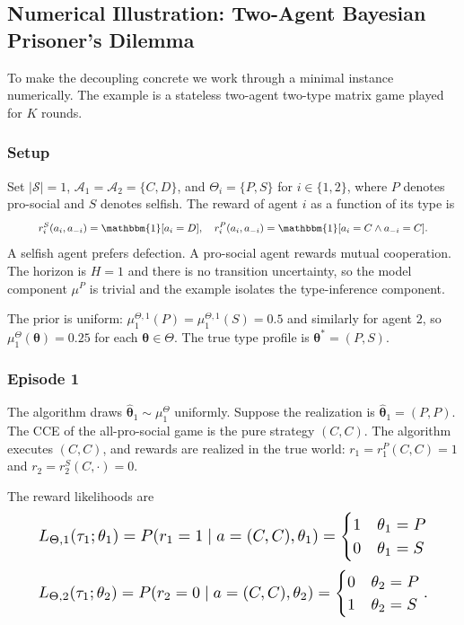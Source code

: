 \subsection{Numerical Illustration: Two-Agent Bayesian Prisoner's Dilemma}
\label{sec:example}

To make the decoupling concrete we work through a minimal instance numerically. The example is a stateless two-agent two-type matrix game played for $K$ rounds.

\subsubsection{Setup}

Set $|\mathcal{S}| = 1$, $\mathcal{A}_1 = \mathcal{A}_2 = \{C, D\}$, and $\Theta_i = \{P, S\}$ for $i \in \{1, 2\}$, where $P$ denotes pro-social and $S$ denotes selfish. The reward of agent $i$ as a function of its type is
\begin{equation}\resizebox{0.9\linewidth}{!}{$\displaystyle r_i^S(a_i, a_{-i}) = \mathbbm{1}[a_i = D], \quad r_i^P(a_i, a_{-i}) = \mathbbm{1}[a_i = C \wedge a_{-i} = C]. $}\end{equation}
A selfish agent prefers defection. A pro-social agent rewards mutual cooperation. The horizon is $H = 1$ and there is no transition uncertainty, so the model component $\mu^P$ is trivial and the example isolates the type-inference component.

The prior is uniform: $\mu_1^{\Theta,1}(P) = \mu_1^{\Theta,1}(S) = 0.5$ and similarly for agent $2$, so $\mu_1^\Theta(\boldsymbol{\theta}) = 0.25$ for each $\boldsymbol{\theta} \in \Theta$. The true type profile is $\boldsymbol{\theta}^* = (P, S)$.

\subsubsection{Episode 1}

The algorithm draws $\hat{\boldsymbol{\theta}}_1 \sim \mu_1^\Theta$ uniformly. Suppose the realization is $\hat{\boldsymbol{\theta}}_1 = (P, P)$. The CCE of the all-pro-social game is the pure strategy $(C, C)$. The algorithm executes $(C, C)$, and rewards are realized in the true world: $r_1 = r_1^P(C, C) = 1$ and $r_2 = r_2^S(C, \cdot) = 0$.

The reward likelihoods are
\begin{equation}\resizebox{0.9\linewidth}{!}{$\displaystyle L_{\Theta,1}(\tau_1; \theta_1) = P(r_1 = 1 \mid a = (C,C), \theta_1) = \begin{cases} 1 & \theta_1 = P \\ 0 & \theta_1 = S \end{cases} $}\end{equation}
\begin{equation}\resizebox{0.9\linewidth}{!}{$\displaystyle L_{\Theta,2}(\tau_1; \theta_2) = P(r_2 = 0 \mid a = (C,C), \theta_2) = \begin{cases} 0 & \theta_2 = P \\ 1 & \theta_2 = S \end{cases}. $}\end{equation}

